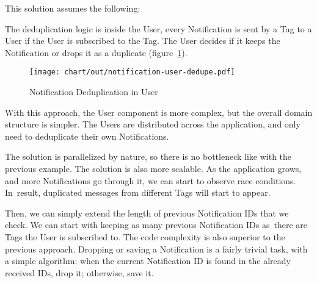 This solution assumes the following:

The deduplication logic is inside the User,
every Notification is sent by a Tag to a User
if the User is subscribed to the Tag.
The User decides if it keeps the Notification
or drops it as a duplicate
(figure~\ref{fig:notification-user-dedupe}).

\begin{figure}[h]
  \centering
  \texttt{[image: chart/out/notification-user-dedupe.pdf]}
  \caption{Notification Deduplication in User}
  \label{fig:notification-user-dedupe}
\end{figure}

With this approach,
the User component is more complex,
but the overall domain structure is simpler.
The Users are distributed across the application,
and only need to deduplicate their own Notifications.

The solution is parallelized by nature,
so there is no bottleneck
like with the previous example.
The solution is also more scalable.
As the application grows,
and more Notifications go through it,
we can start to observe race conditions.
In~result,
duplicated messages from different Tags
will start to appear.

Then, we can simply extend the length of
previous Notification \acp{ID} that we check.
We can start with keeping as many previous
Notification \acp{ID}
as~there are Tags the User is subscribed to.
The code complexity is also superior
to the previous approach.
Dropping or saving a Notification is a fairly trivial task,
with a simple algorithm:
when the current Notification \ac{ID} is found in the
already received \acp{ID}, drop it; otherwise, save it.
